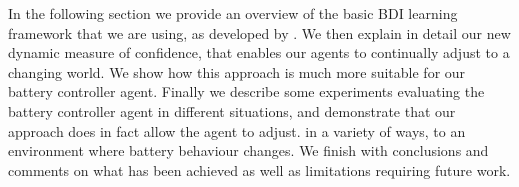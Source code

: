 In the following section we provide an overview of the basic BDI
learning framework that we are using, as developed by \cite{}. We then
explain in detail our new dynamic measure of confidence, that enables
our agents to continually adjust to a changing world. We show how this
approach is much more suitable for our battery controller
agent. Finally we describe some experiments evaluating the battery
controller agent in different situations, and demonstrate that our
approach does in fact allow the agent to adjust. in a variety of ways,
to an environment where battery behaviour changes. We finish with
conclusions and comments on what has been achieved as well as
limitations requiring future work.

